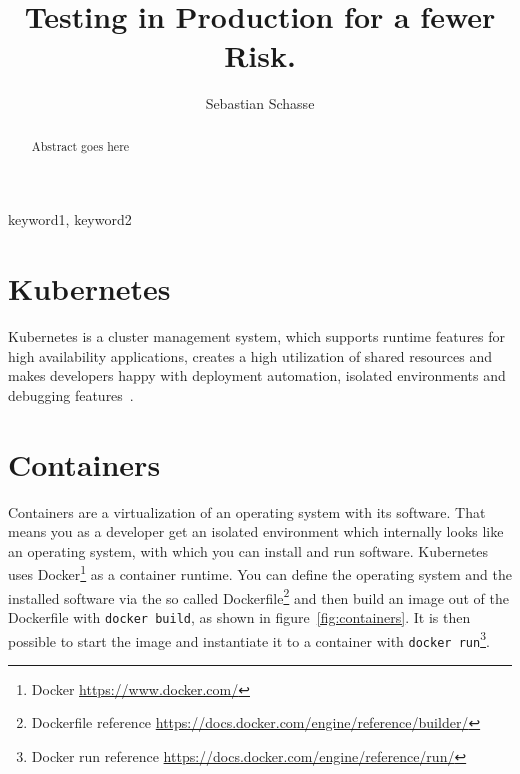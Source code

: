 \documentclass[runningheads,a4paper]{llncs}
\begin{document}
\title{Testing in Production for a fewer Risk.}

\author{Sebastian Schasse}

%
\iffalse
\author{Firstname Lastname\inst{1} \and Firstname Lastname\inst{2} }

\institute{
Insitute 1\\
\email{...}\and
Insitute 2\\
\email{...}
}
\fi

\maketitle

\begin{abstract}
Abstract goes here
\end{abstract}

\begin{keywords}
keyword1, keyword2
\end{keywords}

\section{Kubernetes}

Kubernetes is a cluster management system, which supports runtime features for high availability applications, creates a high utilization of shared resources and makes developers happy with deployment automation, isolated environments and debugging features~\cite{borg_kubernetes}.

\section{Containers}

Containers are a virtualization of an operating system with its software. That means you as a developer get an isolated environment which internally looks like an operating system, with which you can install and run software. Kubernetes uses Docker\footnote{Docker \url{https://www.docker.com/}} as a container runtime. You can define the operating system and the installed software via the so called Dockerfile\footnote{Dockerfile reference \url{https://docs.docker.com/engine/reference/builder/}} and then build an image out of the Dockerfile with \texttt{docker build}, as shown in figure~\ref{fig:containers}. It is then possible to start the image and instantiate it to a container with \texttt{docker run}\footnote{Docker run reference \url{https://docs.docker.com/engine/reference/run/}}.
\end{document}
